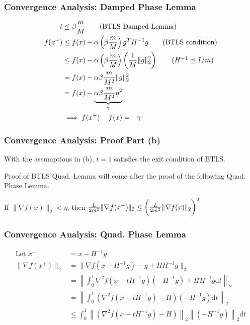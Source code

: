 \documentclass{beamer}
\begin{document}
\begin{frame}
    \frametitle{Convergence Analysis: Damped Phase Lemma} 
	\begin{align}
	t &\leq \beta \frac{m}{M} \tag{BTLS Damped Lemma} \\
	f(x^+) &\leq f(x) - \alpha\left(\beta \frac{m}{M} \right) g^T H^{-1} g \tag{BTLS condition} \\
	&\leq f(x) - \alpha\left(\beta \frac{m}{M} \right) \left(\frac{1}{M}\|g\|_2^2 \right) \tag{$H^{-1} \preceq I/m$} \\
	&= f(x) - \alpha\beta \frac{m}{M^2}\|g\|_2^2 \notag \\
	&= f(x) - \underbrace{\alpha\beta \frac{m}{M^2} \eta^2}_{\gamma} \\
	&\implies f(x^+) - f(x) = - \gamma
	\end{align}
\end{frame}
\begin{frame}
    \frametitle{Convergence Analysis: Proof Part (b)}
    \begin{lemma}
        With the assumptions in (b), $t = 1$ satisfies the exit condition of BTLS.
    \end{lemma}
    Proof of BTLS Quad. Lemma will come after the proof of the following Quad.
    Phase Lemma.
    \begin{lemma}
        If $\|\nabla f(x)\|_2 < \eta$, then 
        $ \frac{L}{2m^2} \|\nabla_{} f (x^{+})\|_2 \leq
                \bigg(\frac{L}{2m^2} \|\nabla f(x)\|_2 \bigg)^2 $
    \end{lemma}

\end{frame}
\begin{frame}
    \frametitle{Convergence Analysis: Quad. Phase Lemma}
    \begin{align}
        \text{Let } x^+ &= x - H^{-1}g \tag{BTLS Quad. Lemma} \\
    \| \nabla f(x^{+})\|_2 &= \| \nabla f(x-H^{-1}g) - g + HH^{-1}g \|_2 \tag{Add zero} \\
	&= \left\|\int_{0}^{1} \nabla^2 f(x-tH^{-1}g) (-H^{-1}g) + HH^{-1}g \mathrm{d}t \right\|_2 \tag{Fund. Theorem of Calculus} \\
	&= \left\| \int_{0}^{1} (\nabla^2 f(x-tH^{-1}g) - H) (-H^{-1}g) \mathrm{d}t \right\|_2 \tag{Rearrange} \\
	&\leq \int_{0}^{1} \left\| (\nabla^2 f(x-tH^{-1}g) - H)\right\|_2 \left\| (-H^{-1}g)\right\|_2 \mathrm{d}t  \tag{Triangle inequality of norms}
    \end{align}
\end{frame}
\end{document}
